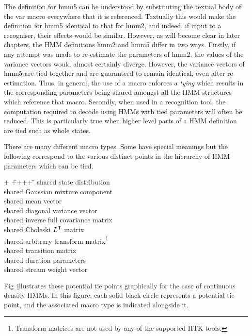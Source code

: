 The definition for \textsf{hmm5} can be understood by substituting
the textual body of the \textsf{var} macro everywhere that it is
referenced.  Textually this would make the definition for \textsf{hmm5}
identical to that for \textsf{hmm2}, and indeed, if input to a recogniser,
their effects would be similar.  
However, as will become clear in later chapters,
the HMM definitions \textsf{hmm2} and  \textsf{hmm5} differ
in two ways.  Firstly,  if
any attempt was made to re-estimate the parameters of \textsf{hmm2},
the values of the variance vectors would almost certainly
diverge.  However,
the variance vectors of \textsf{hmm5} are tied together and are
guaranteed to remain identical, even after re-estimation.  Thus,
in general, the use of a macro enforces a \textit{tying} which
results in the corresponding parameters being shared amongst
all the HMM structures which reference that macro.
Secondly, when used in a recognition tool, the computation required
to decode using HMMs with tied parameters will often be reduced.
This is particularly true when higher level parts of a HMM definition
are tied such as whole states.

There are many different macro types.  Some have special
meanings but the following correspond to
the various distinct points in the hierarchy of HMM parameters which
can be tied.  
\begin{tabbing}
+ \= ++++ \=  \kill
\>  \>  shared state distribution\\
\>  \>  shared Gaussian mixture component \\
\>  \>  shared mean vector \\
\>  \>  shared diagonal variance vector \\
\>  \>  shared inverse full covariance matrix \\
\>  \>  shared Choleski $L^{\scriptstyle\sf T}$ matrix \\
\>  \>  shared arbitrary transform matrix\footnote{
Transform matrices are not used by any of the supported HTK tools.
}
 \\
\>  \>  shared transition matrix \\
\>  \>  shared duration parameters \\
\>  \>  shared stream weight vector 
\end{tabbing}

Fig~\href{f:hierarch} illustrates these potential
tie points graphically for the case of continuous density HMMs.
In this figure, each solid black circle represents a potential
tie point, and the associated macro type is indicated alongside it.

